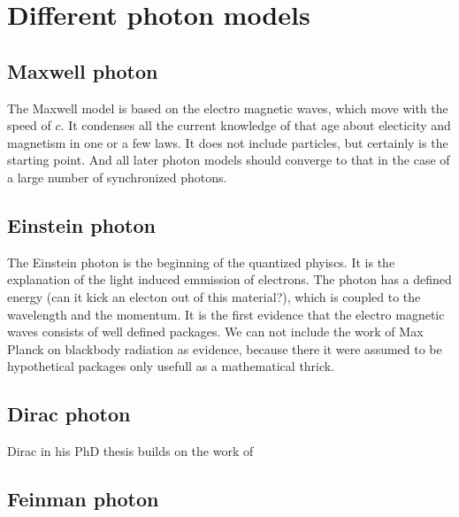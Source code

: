 \section{Different photon models}

\subsection{Maxwell photon}
The Maxwell model is based on the electro magnetic waves, which move with the speed of $c$. It condenses all the current knowledge of that age about electicity and magnetism in one or a few laws. It does not include particles, but certainly is the starting point. And all later photon models should converge to that in the case of a large number of synchronized photons.


\subsection{Einstein photon}
The Einstein photon is the beginning of the quantized phyiscs. It is the explanation of the light induced emmission of electrons. The photon has a defined energy (can it kick an electon out of this material?), which is coupled to the wavelength and the momentum. It is the first evidence that the electro magnetic waves consists of well defined packages. We can not include the work of Max Planck on blackbody radiation as evidence, because there it were assumed to be hypothetical packages only usefull as a mathematical thrick.


\subsection{Dirac photon}
Dirac in his PhD thesis builds on the work of 


\subsection{Feinman photon}



